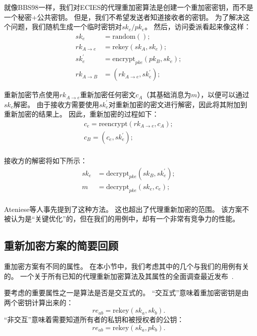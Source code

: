 \documentclass[longbibliography,nofootinbib]{revtex4-1}
\begin{document}
就像BBS98一样，我们对ECIES的代理重加密算法是创建一个重加密密钥，而不是一个秘密+公共密钥。
但是，我们不希望发送者知道接收者的密钥。
为了解决这个问题，我们随机生成一个临时密钥对$sk_e/pk_e$。
然后，访问委派看起来像这样：
\begin{align}
    \label{eq:ephemeral-trick}
    sk_e &= \text{random}();\\
    rk_{A\rightarrow e} &= \text{rekey}(sk_A, sk_e);\\
    \label{eq:ephemeral-trick-end}
    sk_e^{\prime} &= \text{encrypt}_{pke}(pk_B, sk_e);\\
    rk_{A\rightarrow B} &= (rk_{A\rightarrow e}, sk_e^{\prime});
\end{align}

重新加密节点使用$rk_{A\rightarrow e}$重新加密任何密文$c_A$（其基础消息为$m$），以便可以通过$sk_e$解密。
由于接收方需要使用$sk_e^{\prime}$对重新加密的密文进行解密，因此将其附加到重新加密的结果上。
因此，重新加密的过程如下：
\begin{align}
    c_e = \text{reencrypt}(rk_{A\rightarrow e}, c_{A});\\
    c_B = (c_e, sk_e^{\prime});\\
\end{align}

接收方的解密将如下所示：
\begin{align}
    sk_e &= \text{decrypt}_{pke}(sk_B, sk_e^{\prime});\\
    m &= \text{decrypt}_{pke}(sk_e, c_e);\\
\end{align}

Ateniese等人\cite{AFGH}事先提到了这种方法。
这也超出了代理重新加密的范围。
该方案不被认为是“关键优化”的，但在我们的用例中，却有一个非常有竞争力的性能。

\subsection{重新加密方案的简要回顾}

重加密方案有不同的属性。 在本小节中，我们考虑其中的几个与我们的用例有关的。 一个关于所有已知的代理重新加密算法及其属性的全面调查最近发布~\cite{nunez2017proxy}.

要考虑的重要属性之一是算法是否是交互式的。 “交互式”意味着重加密密钥是由两个密钥计算出来的：
\begin{equation}
    re_{ab} = \text{rekey}(sk_a, sk_b).
\end{equation}
“非交互”意味着需要知道所有者的私钥和被授权者的公钥：
\begin{equation}
    re_{ab} = \text{rekey}(sk_a, pk_b).
\end{equation}
\end{document}
